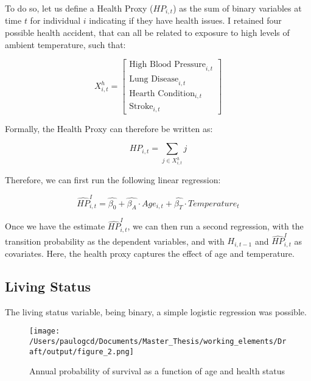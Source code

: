 \documentclass{article}
\begin{document}
To do so, let us define a Health Proxy ($HP_{i,t}$) as 
the sum of binary variables at time $t$ for individual 
$i$ indicating if they have health issues.
I retained four possible health accident, 
that can all be related to exposure to 
high levels of ambient temperature, such that: 

$$
    X_{i,t}^{h} =
    \begin{bmatrix}
        \text{High Blood Pressure}_{i,t} \\
        \text{Lung Disease}_{i,t} \\ 
        \text{Hearth Condition}_{i,t} \\ 
        \text{Stroke}_{i,t}
    \end{bmatrix}
$$

Formally, the Health Proxy can therefore be written as:

\begin{equation}
    HP_{i,t} = \sum_{j\in X^{h}_{i,t}} j
\end{equation}

Therefore, we can first run the following linear regression: 

\begin{equation}
    \widehat{HP}_{i,t}^{I} =  \widehat{\beta_0} +
    \widehat{\beta_{A}} \cdot Age_{i,t} +
    \widehat{\beta_{T}} \cdot Temperature_{t}
\end{equation}

Once we have the estimate $\widehat{HP}_{i,t}^{I}$, we can
then run a second regression, with the transition probability 
as the dependent variables, and with $H_{i,t-1}$ and 
$\widehat{HP}_{i,t}^{I}$ as covariates.
Here, the health proxy captures the effect of age and
temperature.

\subsection{Living Status}

The living status variable, being binary, 
a simple logistic regression was possible. 

\begin{figure}[H]
    \texttt{[image: /Users/paulogcd/Documents/Master\_Thesis/working\_elements/Draft/output/figure\_2.png]}
    \caption{Annual probability of survival as a function of age and health status}
\end{figure}
\end{document}
